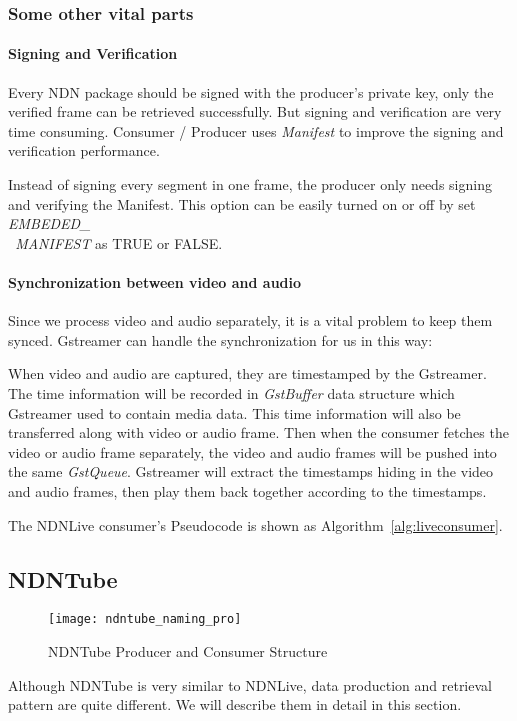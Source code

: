 \subsubsection{Some other vital parts}
\paragraph{Signing and Verification} %
\label{par:signing_and_verification}
\vspace{0.3cm}
Every NDN package should be signed with the producer's private key, only the verified frame can be retrieved successfully. But signing and verification are very time consuming. Consumer / Producer uses \textit{Manifest} \cite{api-tr} to improve the signing and verification performance. 

Instead of signing every segment in one frame, the producer only needs signing and verifying the Manifest. This option can be easily turned on or off by set \textit{EMBEDED\_\\\ MANIFEST} as TRUE or FALSE.

\paragraph{Synchronization between video and audio}
\label{par:sync}
\vspace{0.3cm}
Since we process video and audio separately, it is a vital problem to keep them synced. Gstreamer can handle the synchronization for us in this way:

When video and audio are captured, they are timestamped by the Gstreamer. The time information will be recorded in \textit{GstBuffer} data structure which Gstreamer used to contain media data. This time information will also be transferred along with video or audio frame. Then when the consumer fetches the video or audio frame separately, the video and audio frames will be pushed into the same \textit{GstQueue}. Gstreamer will extract the timestamps hiding in the video and audio frames, then play them back together according to the timestamps. 

The NDNLive consumer's Pseudocode is shown as Algorithm~\ref{alg:liveconsumer}.

\subsection{NDNTube}
\begin{figure*}[ht]
  \centering
  \texttt{[image: ndntube\_naming\_pro]}
  \caption{NDNTube Producer and Consumer Structure}
  \label{fig:ndntube_cp}
\end{figure*}
Although NDNTube is very similar to NDNLive, data production and retrieval pattern are quite different. We will describe them in detail in this section.

